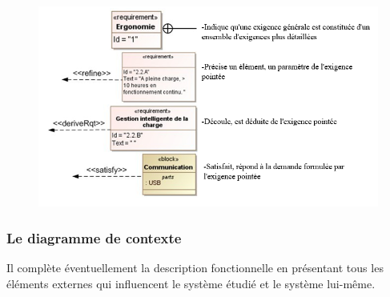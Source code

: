 \documentclass[12pt,a4paper]{report}
\begin{document}
\noindent \textbf{}


\noindent \begin{flushleft}
	
	
	\noindent 
	
	\noindent 
	
	\noindent 
	
	\noindent 
	
	\noindent 
	
	\noindent 
	\begin{figure}[H]
		\centering
		\includegraphics[width=0.8\linewidth]{Capture2.png}
		
	\end{figure}
	
	\noindent 
	
	\noindent 
	
	\noindent 
	
	\noindent 
	
	\noindent 
	
	\noindent 
	
	\noindent 
	
	\noindent 
	
	\noindent 
	
	\noindent 
	
	\noindent 
	
	\noindent 
	
	\noindent 
\end{flushleft}


\subsubsection{ Le diagramme de contexte}

\noindent \begin{flushleft}
	Il compl\`{e}te \'{e}ventuellement la description fonctionnelle en pr\'{e}sentant tous les \'{e}l\'{e}ments externes qui influencent le syst\`{e}me \'{e}tudi\'{e} et le syst\`{e}me lui-m\^{e}me.
	
	\noindent 
\end{flushleft}
\end{document}
